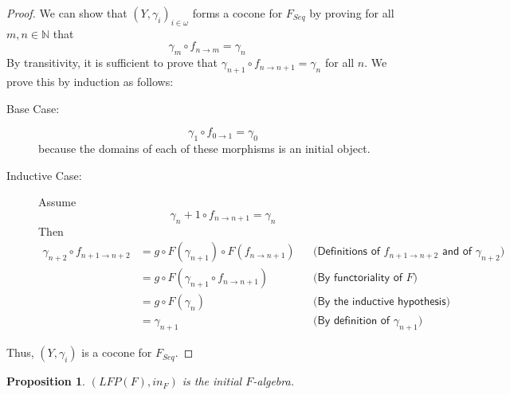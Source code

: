 \documentclass{msthesis}
\newtheorem{prop}[theorem]{Proposition}
\theoremstyle{definition}
\newcommand{\nat}{\mathbb{N}}
\begin{document}
\begin{proof}
    We can show that $(Y, \gamma_i)_{i \in \omega}$ forms a cocone for $F_{Seq}$ by proving for all $m, n \in \nat$ that
    \begin{equation}\label{eq:falg_cocone}
        \gamma_m \circ f_{n \to m} = \gamma_n
    \end{equation}
    By transitivity, it is sufficient to prove that $\gamma_{n+1} \circ f_{n \to n+1} = \gamma_n$ for all $n$.  We prove this by induction as follows:
    \begin{description}
        \item[Base Case:] 
        \[ \gamma_1 \circ f_{0 \to 1} = \gamma_0 \]
        because the domains of each of these morphisms is an initial object.
        \item[Inductive Case:]
        Assume 
        \[ \gamma_n+1 \circ f_{n \to n+1} = \gamma_n \]
        Then
        \begin{align*}
            \gamma_{n+2} \circ f_{n+1 \to n+2} &= g \circ F(\gamma_{n+1}) \circ F(f_{n \to n+1}) && \textsf{(Definitions of $f_{n+1 \to n+2}$ and of $\gamma_{n+2}$)}\\
            &= g \circ F(\gamma_{n+1} \circ f_{n \to n+1}) && \textsf{(By functoriality of $F$)}\\
            &= g \circ F(\gamma_n) && \textsf{(By the inductive hypothesis)}\\
            &= \gamma_{n+1} && \textsf{(By definition of $\gamma_{n+1})$}
        \end{align*}
    \end{description}
    Thus, $(Y, \gamma_i)$ is a cocone for $F_{Seq}$.
\end{proof}

\begin{prop}\label{prop:ininitial}
    $(LFP(F), in_F)$ is the initial $F$-algebra.
\end{prop}
\end{document}
